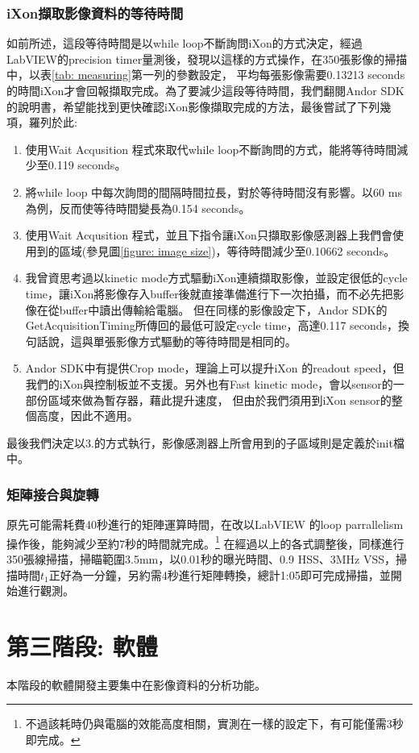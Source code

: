 \documentclass[12pt]{article}
\begin{document}
    \subsubsection{iXon擷取影像資料的等待時間}
    如前所述，這段等待時間是以while loop不斷詢問iXon的方式決定，經過LabVIEW的precision timer量測後，發現以這樣的方式操作，在350張影像的掃描中，以表\ref{tab: measuring}第一列的參數設定，
    平均每張影像需要0.13213 seconds的時間iXon才會回報擷取完成。為了要減少這段等待時間，我們翻閱Andor SDK的說明書，希望能找到更快確認iXon影像擷取完成的方法，最後嘗試了下列幾項，羅列於此:
    \begin{enumerate}
        \item 使用Wait Acqusition 程式來取代while loop不斷詢問的方式，能將等待時間減少至0.119 seconds。
        \item 將while loop 中每次詢問的間隔時間拉長，對於等待時間沒有影響。以60 ms為例，反而使等待時間變長為0.154 seconds。
        \item 使用Wait Acqusition 程式，並且下指令讓iXon只擷取影像感測器上我們會使用到的區域(參見圖\ref{figure: image size})，等待時間減少至0.10662 seconds。
        \item 我曾資思考過以kinetic mode方式驅動iXon連續擷取影像，並設定很低的cycle time，讓iXon將影像存入buffer後就直接準備進行下一次拍攝，而不必先把影像在從buffer中讀出傳輸給電腦。
        但在同樣的影像設定下，Andor SDK的GetAcquisitionTiming所傳回的最低可設定cycle time，高達0.117 seconds，換句話說，這與單張影像方式驅動的等待時間是相同的。
        \item Andor SDK中有提供Crop mode，理論上可以提升iXon 的readout speed，但我們的iXon與控制板並不支援。另外也有Fast kinetic mode，會以sensor的一部份區域來做為暫存器，藉此提升速度，
        但由於我們須用到iXon sensor的整個高度，因此不適用。
    \end{enumerate}
    最後我們決定以3.的方式執行，影像感測器上所會用到的子區域則是定義於init檔中。
    \subsubsection{矩陣接合與旋轉}
    原先可能需耗費40秒進行的矩陣運算時間，在改以LabVIEW 的loop parrallelism操作後，能夠減少至約7秒的時間就完成。\footnote{不過該耗時仍與電腦的效能高度相關，實測在一樣的設定下，有可能僅需3秒即完成。}
    在經過以上的各式調整後，同樣進行350張線掃描，掃瞄範圍3.5mm，以0.01秒的曝光時間、0.9 HSS、3MHz VSS，掃描時間$t_1$正好為一分鐘，另約需4秒進行矩陣轉換，總計1:05即可完成掃描，並開始進行觀測。

    \section{第三階段: 軟體}
    本階段的軟體開發主要集中在影像資料的分析功能。
\end{document}
